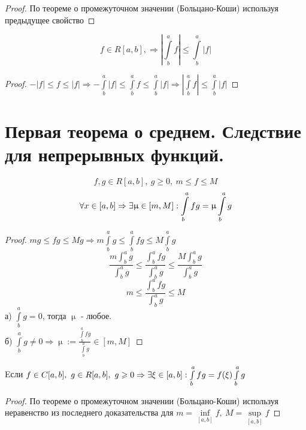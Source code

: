 \documentclass[matan]{subfiles}
\begin{document}
  \begin{proof}
      По теореме о промежуточном значении (Больцано-Коши) используя предыдущее свойство
  \end{proof}

  \begin{Property}[8]
      \[f \in R[a,b], \Rightarrow |\int\limits^a_b f| \leqslant \int\limits^a_b |f|\]
  \end{Property}

  \begin{proof}
      $-|f| \leqslant f \leqslant |f| \Rightarrow -\int\limits^a_b |f| \leqslant \int\limits^a_b f \leqslant \int\limits^a_b |f| \Rightarrow |\int\limits^a_b f| \leqslant \int\limits^a_b |f|$
  \end{proof}

  \newpage
  \section{Первая теорема о среднем. Следствие для непрерывных функций.}

  \begin{Theorem}
      \[f,g \in R[a,b],\ g \geqslant 0,\ m \leqslant f \leqslant M\] \[\forall x \in [a,b] \Rightarrow \exists \upmu \in [m,M]: \int\limits^a_b f g = \upmu \int\limits^a_b g\]
  \end{Theorem}

  \begin{proof}
      $m g \leqslant f g \leqslant Mg \Rightarrow m \int\limits^a_b g \leqslant \int\limits^a_b f g \leqslant M \int\limits^a_b g$
      \[\frac{m \int_b^a g}{\int_b^a g} \leq \frac{\int_b^a fg}{ \int_b^a g} \leq \frac{M \int_b^a g}{\int_b^a g}\]
    \[m \leq \frac{\int_b^a fg}{\int_b^a g} \leq M\]
      а) $\int\limits^a_b g = 0$, тогда $\upmu$ - любое.\\
      б) $\int\limits^a_b g \neq 0 \Rightarrow \upmu:=\frac{\int\limits^a_b f g}{\int\limits^a_b g} \in [m,M]$
  \end{proof}

  \begin{consequence}
      Eсли $f \in C[a,b],\ g \in R[a,b],\ g \geqslant 0 \Rightarrow \exists \xi \in [a,b]: \int\limits^a_b f g = f(\xi) \int\limits^a_b g$
  \end{consequence}


  \begin{proof}
      По теореме о промежуточном значении (Больцано-Коши) используя неравенство из последнего доказательства для $m=\inf\limits_{[a,b]} f,\ M=\sup\limits_{[a,b]} f$
  \end{proof}
\end{document}
